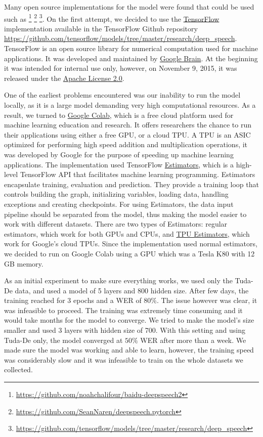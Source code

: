 Many open source implementations for the model were found that could be used such as \footnote{\url{https://github.com/noahchalifour/baidu-deepspeech2}} \footnote{\url{https://github.com/SeanNaren/deepspeech.pytorch}} \footnote{\url{https://github.com/tensorflow/models/tree/master/research/deep_speech}}. On the first attempt, we decided to use the \href{https://www.tensorflow.org/}{TensorFlow} \cite{tensorflow2015-whitepaper} implementation available in the TensorFlow Github repository \url{https://github.com/tensorflow/models/tree/master/research/deep_speech}. TensorFlow is an open source library for numerical computation used for machine applications. It was developed and maintained by \href{https://ai.google/research/teams/brain}{Google Brain}. At the beginning it was intended for internal use only, however, on  November 9, 2015, it was released under the \href{http://www.apache.org/licenses/LICENSE-2.0}{Apache License 2.0}.

One of the earliest problems encountered was our inability to run the model locally, as it is a large model demanding very high computational resources. As a result, we turned to \href{https://colab.research.google.com/}{Google Colab}, which is a free cloud platform used for machine learning education and research. It offers researchers the chance to run their applications using either a free GPU, or a cloud \ac{TPU}. A \ac{TPU} is an \ac{ASIC} optimized for performing high speed addition and multiplication operations, it was developed by Google for the purpose of speeding up machine learning applications. The implementation used TensorFlow \href{https://www.tensorflow.org/guide/estimators}{Estimators}, which is a high-level TensorFlow API that facilitates machine learning programming. Estimators encapsulate training, evaluation and prediction. They provide a training loop that controls building the graph, initializing variables, loading data, handling exceptions and creating checkpoints. For using Estimators, the data input pipeline should be separated from the model, thus making the model easier to work with different datasets. There are two types of Estimators: regular estimators, which work for both GPUs and CPUs, and \href{URL}{TPU Estimators}, which work for Google's cloud \ac{TPU}s. Since the implementation used normal estimators, we decided to run on Google Colab using a GPU which was a Tesla K80 with 12 GB memory.


As an initial experiment to make sure everything works, we used only the Tuda-De data, and used a model of 5 layers and 800 hidden size. After few days, the training reached for 3 epochs and a \ac{WER} of $80\%$. The issue however was clear, it was infeasible to proceed. The training was extremely time consuming and it would take months for the model to converge. We tried to make the model's size smaller and used 3 layers with hidden size of 700. With this setting and using Tuda-De only, the model converged at $50\%$ \ac{WER} after more than a week. We made sure the model was working and able to learn, however, the training speed was considerably slow and it was infeasible to train on the whole datasets we collected.


